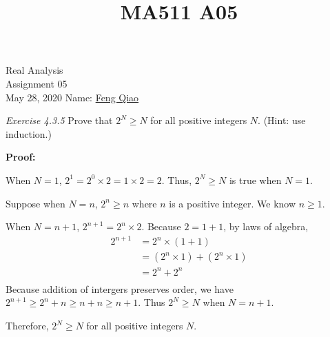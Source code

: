 \documentclass[12pt]{article}
\title{MA511 A05}
\begin{document}
\begin{flushleft}
{\sc \Large Real Analysis} \\ 
\medskip
Assignment 05\\
May 28, 2020
\hfill Name: \underline{Feng Qiao} \\

\setdefaultleftmargin{0pt}{}{}{}{}{}

\textit{Exercise 4.3.5} Prove that \(2^N \geq N\) for all positive integers \(N\). (Hint: use induction.)

\textbf{Proof:}

When \(N=1\), \(2^1=2^0 \times 2 = 1 \times 2 = 2\). Thus, \(2^N \ge N \)  is true when \(N=1\).

Suppose when \(N = n\), \(2^n \ge n\) where \(n\) is a positive integer.
We know \(n \ge 1\).

When \(N = n +1\), \(2^{n+1} = 2^n \times 2\). Because \(2 = 1 + 1\), by laws of algebra,
\begin{equation*}
  \begin{aligned}
    2^{n+1} & = 2^n \times (1 + 1)\\
    &= (2^n \times 1) + (2^n \times 1)\\
    &= 2^n  + 2^n\\
  \end{aligned}
\end{equation*}
Because addition of intergers preserves order, we have \(2^{n+1} \ge 2^n + n \ge n + n \ge n + 1\).
Thus \(2^N \ge N\) when \(N = n + 1\).

Therefore, \(2^N \geq N\) for all positive integers \(N\).


\end{flushleft}
\end{document}
